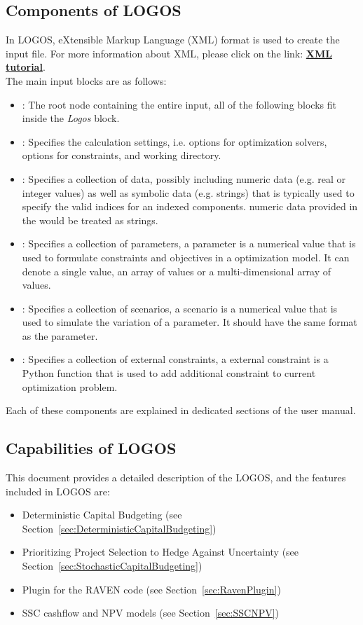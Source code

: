 \subsection{Components of LOGOS}
In LOGOS, eXtensible Markup Language (XML) format is used to create the input file. For more
information about XML, please click on the link:
\href{https://www.w3schools.com/xml/default.asp}{\textbf{XML tutorial}}.
%
\\The main input blocks are as follows:
\begin{itemize}
  \item {}: The root node containing the
  entire input, all of
  the following blocks fit inside the \emph{Logos} block.
  \item {}: Specifies the calculation settings, i.e. options for
	optimization solvers, options for constraints, and working directory.
  \item {}: Specifies a collection of data, possibly including
	numeric data (e.g. real or integer values) as well as symbolic data (e.g. strings)
	that is typically used to specify the valid indices for an indexed components.
	\nb numeric data provided in the  would be treated as strings.
	\item {}: Specifies a collection of parameters, a parameter
	is a numerical value that is used to formulate constraints and objectives in a
	optimization model. It can denote a single value, an array of values or a multi-dimensional
	array of values.
	\item {}: Specifies a collection of scenarios, a scenario is a
	numerical value that is used to simulate the variation of a parameter. It should have
	the same format as the parameter.
	\item {}: Specifies a collection of external constraints, a
	external constraint is a Python function that is used to add additional constraint to
	current optimization problem.
\end{itemize}

Each of these components are explained in dedicated sections of the user manual.

\subsection{Capabilities of LOGOS}
This document provides a detailed description of the LOGOS, and the features included in LOGOS are:
\begin{itemize}
	\item Deterministic Capital Budgeting (see Section~\ref{sec:DeterministicCapitalBudgeting})
	\item Prioritizing Project Selection to Hedge Against Uncertainty (see Section~\ref{sec:StochasticCapitalBudgeting})
	\item Plugin for the RAVEN code (see Section~\ref{sec:RavenPlugin})
	\item SSC cashflow and NPV models (see Section~\ref{sec:SSCNPV})
\end{itemize}
